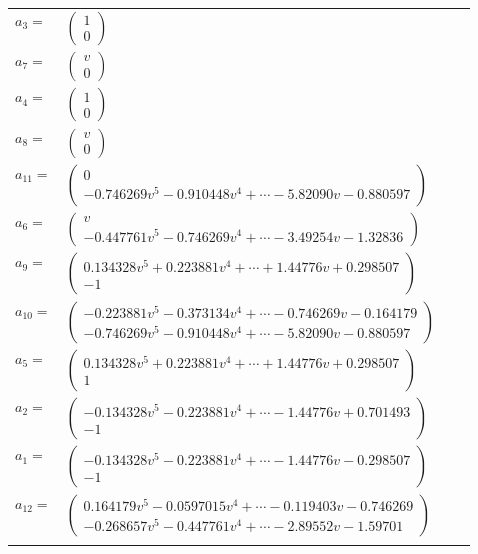 \documentclass[1p]{elsarticle_modified}
\theoremstyle{definition}
\begin{document}
\begin{tabular}{m{7pt} m{180pt} m{7pt} m{180pt} }
\flushright $a_{3}=$&$\begin{pmatrix}1\\0\end{pmatrix}$ \\
\flushright $a_{7}=$&$\begin{pmatrix}v\\0\end{pmatrix}$ \\
\flushright $a_{4}=$&$\begin{pmatrix}1\\0\end{pmatrix}$ \\
\flushright $a_{8}=$&$\begin{pmatrix}v\\0\end{pmatrix}$ \\
\flushright $a_{11}=$&$\begin{pmatrix}0\\-0.746269 v^{5}-0.910448 v^{4}+\cdots-5.82090 v-0.880597\end{pmatrix}$ \\
\flushright $a_{6}=$&$\begin{pmatrix}v\\-0.447761 v^{5}-0.746269 v^{4}+\cdots-3.49254 v-1.32836\end{pmatrix}$ \\
\flushright $a_{9}=$&$\begin{pmatrix}0.134328 v^{5}+0.223881 v^{4}+\cdots+1.44776 v+0.298507\\-1\end{pmatrix}$ \\
\flushright $a_{10}=$&$\begin{pmatrix}-0.223881 v^{5}-0.373134 v^{4}+\cdots-0.746269 v-0.164179\\-0.746269 v^{5}-0.910448 v^{4}+\cdots-5.82090 v-0.880597\end{pmatrix}$ \\
\flushright $a_{5}=$&$\begin{pmatrix}0.134328 v^{5}+0.223881 v^{4}+\cdots+1.44776 v+0.298507\\1\end{pmatrix}$ \\
\flushright $a_{2}=$&$\begin{pmatrix}-0.134328 v^{5}-0.223881 v^{4}+\cdots-1.44776 v+0.701493\\-1\end{pmatrix}$ \\
\flushright $a_{1}=$&$\begin{pmatrix}-0.134328 v^{5}-0.223881 v^{4}+\cdots-1.44776 v-0.298507\\-1\end{pmatrix}$ \\
\flushright $a_{12}=$&$\begin{pmatrix}0.164179 v^{5}-0.0597015 v^{4}+\cdots-0.119403 v-0.746269\\-0.268657 v^{5}-0.447761 v^{4}+\cdots-2.89552 v-1.59701\end{pmatrix}$\\&\end{tabular}
\end{document}
